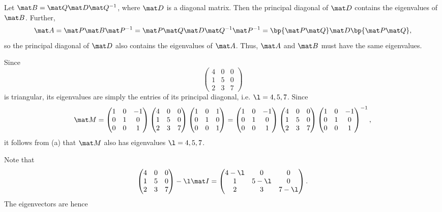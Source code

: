\begin{solution}
    \begin{ppart}
        Let $\mat B = \mat Q \mat D \mat Q^{-1}$, where $\mat D$ is a diagonal matrix. Then the principal diagonal of $\mat D$ contains the eigenvalues of $\mat B$. Further, \[\mat A = \mat P \mat B \mat P^{-1} = \mat P \mat Q \mat D \mat Q^{-1} \mat P^{-1} = \bp{\mat P \mat Q} \mat D \bp{\mat P \mat Q},\] so the principal diagonal of $\mat D$ also contains the eigenvalues of $\mat A$. Thus, $\mat A$ and $\mat B$ must have the same eigenvalues.
    \end{ppart}
    \begin{ppart}
        Since \[\begin{pmatrix}4 & 0 & 0 \\ 1 & 5 & 0 \\ 2 & 3 & 7\end{pmatrix}\] is triangular, its eigenvalues are simply the entries of its principal diagonal, i.e. $\l = 4, 5, 7$. Since \[\mat M = \begin{pmatrix}1 & 0 & -1 \\ 0 & 1 & 0 \\ 0 & 0 & 1\end{pmatrix} \begin{pmatrix}4 & 0 & 0 \\ 1 & 5 & 0 \\ 2 & 3 & 7\end{pmatrix} \begin{pmatrix}1 & 0 & 1 \\ 0 & 1 & 0 \\ 0 & 0 & 1\end{pmatrix} = \begin{pmatrix}1 & 0 & -1 \\ 0 & 1 & 0 \\ 0 & 0 & 1\end{pmatrix} \begin{pmatrix}4 & 0 & 0 \\ 1 & 5 & 0 \\ 2 & 3 & 7\end{pmatrix} \begin{pmatrix}1 & 0 & -1 \\ 0 & 1 & 0 \\ 0 & 0 & 1\end{pmatrix}^{-1},\] it follows from (a) that $\mat M$ also has eigenvalues $\l = 4, 5, 7$.
    \end{ppart}
    \begin{ppart}
        Note that \[\begin{pmatrix}4 & 0 & 0 \\ 1 & 5 & 0 \\ 2 & 3 & 7\end{pmatrix} - \l \mat I = \begin{pmatrix}4 - \l & 0 & 0 \\ 1 & 5-\l & 0 \\ 2 & 3 & 7-\l\end{pmatrix}.\] The eigenvectors are hence

\end{ppart}
\end{solution}
